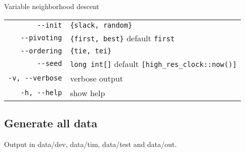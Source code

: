 \documentclass[a4paper,12pt]{article}
\begin{document}
Variable neighborhood descent



\begin{tabular}{rl}
\verb!--init! & \verb!{slack, random}!\\
\verb!--pivoting! & \verb!{first, best}! default \verb!first!\\
\verb!--ordering! & \verb!{tie, tei}!\\
\verb!--seed! & \verb!long int[]! default \verb![high_res_clock::now()]!\\
\verb!-v, --verbose! & verbose output\\
\verb!-h, --help! & show help\\
\end{tabular}




\subsection{Generate all data}

Output in data/dev, data/tim, data/test and data/out.

\appendix
\newpage\cleardoublepage{}
\end{document}
